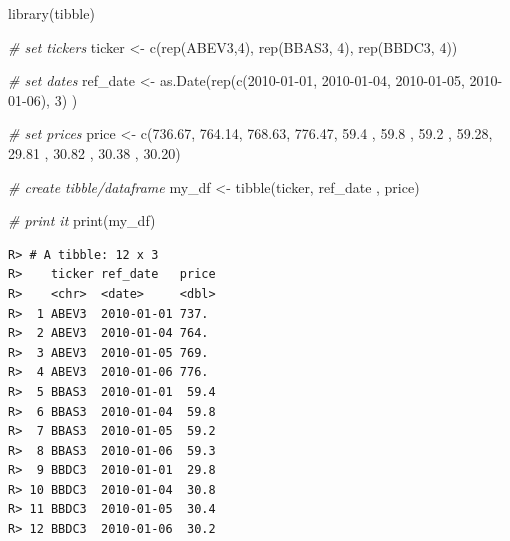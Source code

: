 \documentclass[
  11pt,
]{book}
\newenvironment{Shaded}{\begin{snugshade}}{\end{snugshade}}
\newcommand{\CommentTok}[1]{\textcolor[rgb]{0.37,0.37,0.37}{\textit{#1}}}
\newcommand{\DecValTok}[1]{\textcolor[rgb]{0.06,0.06,0.06}{#1}}
\newcommand{\FloatTok}[1]{\textcolor[rgb]{0.06,0.06,0.06}{#1}}
\newcommand{\FunctionTok}[1]{\textcolor[rgb]{0,0,0}{#1}}
\newcommand{\NormalTok}[1]{#1}
\newcommand{\OtherTok}[1]{\textcolor[rgb]{0.37,0.37,0.37}{#1}}
\newcommand{\StringTok}[1]{\textcolor[rgb]{0.5,0.5,0.5}{#1}}
\begin{document}
\begin{Shaded}
\begin{Highlighting}[]
\FunctionTok{library}\NormalTok{(tibble)}

\CommentTok{\# set tickers}
\NormalTok{ticker }\OtherTok{\textless{}{-}} \FunctionTok{c}\NormalTok{(}\FunctionTok{rep}\NormalTok{(}\StringTok{\textquotesingle{}ABEV3\textquotesingle{}}\NormalTok{,}\DecValTok{4}\NormalTok{),}
            \FunctionTok{rep}\NormalTok{(}\StringTok{\textquotesingle{}BBAS3\textquotesingle{}}\NormalTok{, }\DecValTok{4}\NormalTok{),}
            \FunctionTok{rep}\NormalTok{(}\StringTok{\textquotesingle{}BBDC3\textquotesingle{}}\NormalTok{, }\DecValTok{4}\NormalTok{))}

\CommentTok{\# set dates}
\NormalTok{ref\_date }\OtherTok{\textless{}{-}} \FunctionTok{as.Date}\NormalTok{(}\FunctionTok{rep}\NormalTok{(}\FunctionTok{c}\NormalTok{(}\StringTok{\textquotesingle{}2010{-}01{-}01\textquotesingle{}}\NormalTok{, }\StringTok{\textquotesingle{}2010{-}01{-}04\textquotesingle{}}\NormalTok{,}
                          \StringTok{\textquotesingle{}2010{-}01{-}05\textquotesingle{}}\NormalTok{, }\StringTok{\textquotesingle{}2010{-}01{-}06\textquotesingle{}}\NormalTok{),}
                        \DecValTok{3}\NormalTok{) )}

\CommentTok{\# set prices}
\NormalTok{price }\OtherTok{\textless{}{-}} \FunctionTok{c}\NormalTok{(}\FloatTok{736.67}\NormalTok{, }\FloatTok{764.14}\NormalTok{, }\FloatTok{768.63}\NormalTok{, }\FloatTok{776.47}\NormalTok{,}
           \FloatTok{59.4}\NormalTok{  , }\FloatTok{59.8}\NormalTok{  , }\FloatTok{59.2}\NormalTok{  , }\FloatTok{59.28}\NormalTok{,}
           \FloatTok{29.81}\NormalTok{ , }\FloatTok{30.82}\NormalTok{ , }\FloatTok{30.38}\NormalTok{ , }\FloatTok{30.20}\NormalTok{)}

\CommentTok{\# create tibble/dataframe}
\NormalTok{my\_df }\OtherTok{\textless{}{-}} \FunctionTok{tibble}\NormalTok{(ticker, ref\_date , price)}

\CommentTok{\# print it}
\FunctionTok{print}\NormalTok{(my\_df)}
\end{Highlighting}
\end{Shaded}

\begin{verbatim}
R> # A tibble: 12 x 3
R>    ticker ref_date   price
R>    <chr>  <date>     <dbl>
R>  1 ABEV3  2010-01-01 737. 
R>  2 ABEV3  2010-01-04 764. 
R>  3 ABEV3  2010-01-05 769. 
R>  4 ABEV3  2010-01-06 776. 
R>  5 BBAS3  2010-01-01  59.4
R>  6 BBAS3  2010-01-04  59.8
R>  7 BBAS3  2010-01-05  59.2
R>  8 BBAS3  2010-01-06  59.3
R>  9 BBDC3  2010-01-01  29.8
R> 10 BBDC3  2010-01-04  30.8
R> 11 BBDC3  2010-01-05  30.4
R> 12 BBDC3  2010-01-06  30.2
\end{verbatim}
\end{document}
